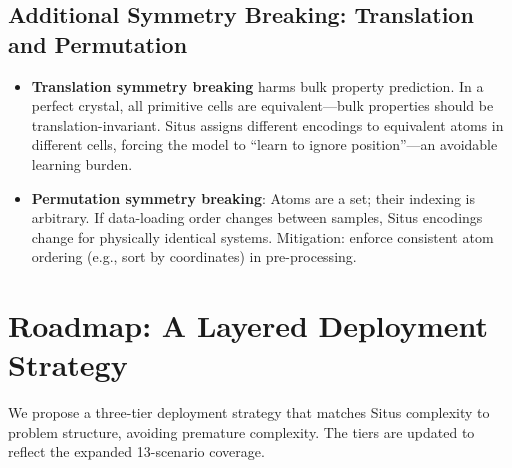 \documentclass[12pt,a4paper]{article}
\begin{document}
\subsection{Additional Symmetry Breaking: Translation and Permutation}

\begin{itemize}[nosep]
\item \textbf{Translation symmetry breaking} harms bulk property prediction. In a perfect crystal, all primitive cells are equivalent—bulk properties should be translation-invariant. Situs assigns different encodings to equivalent atoms in different cells, forcing the model to ``learn to ignore position''—an avoidable learning burden.
\item \textbf{Permutation symmetry breaking}: Atoms are a set; their indexing is arbitrary. If data-loading order changes between samples, Situs encodings change for physically identical systems. Mitigation: enforce consistent atom ordering (e.g., sort by coordinates) in pre-processing.
\end{itemize}

\section{Roadmap: A Layered Deployment Strategy}
\label{sec:roadmap}

We propose a three-tier deployment strategy that matches Situs complexity to problem structure, avoiding premature complexity. The tiers are updated to reflect the expanded 13-scenario coverage.
\end{document}
